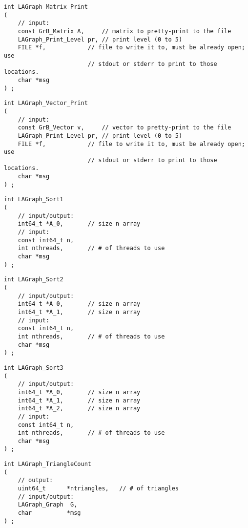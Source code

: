 \begin{verbatim}
int LAGraph_Matrix_Print
(
    // input:
    const GrB_Matrix A,     // matrix to pretty-print to the file
    LAGraph_Print_Level pr, // print level (0 to 5)
    FILE *f,            // file to write it to, must be already open; use
                        // stdout or stderr to print to those locations.
    char *msg
) ;
\end{verbatim}




\begin{verbatim}
int LAGraph_Vector_Print
(
    // input:
    const GrB_Vector v,     // vector to pretty-print to the file
    LAGraph_Print_Level pr, // print level (0 to 5)
    FILE *f,            // file to write it to, must be already open; use
                        // stdout or stderr to print to those locations.
    char *msg
) ;
\end{verbatim}




\begin{verbatim}
int LAGraph_Sort1
(
    // input/output:
    int64_t *A_0,       // size n array
    // input:
    const int64_t n,
    int nthreads,       // # of threads to use
    char *msg
) ;
\end{verbatim}




\begin{verbatim}
int LAGraph_Sort2
(
    // input/output:
    int64_t *A_0,       // size n array
    int64_t *A_1,       // size n array
    // input:
    const int64_t n,
    int nthreads,       // # of threads to use
    char *msg
) ;
\end{verbatim}




\begin{verbatim}
int LAGraph_Sort3
(
    // input/output:
    int64_t *A_0,       // size n array
    int64_t *A_1,       // size n array
    int64_t *A_2,       // size n array
    // input:
    const int64_t n,
    int nthreads,       // # of threads to use
    char *msg
) ;
\end{verbatim}




\begin{verbatim}
int LAGraph_TriangleCount
(
    // output:
    uint64_t      *ntriangles,   // # of triangles
    // input/output:
    LAGraph_Graph  G,
    char          *msg
) ;
\end{verbatim}





